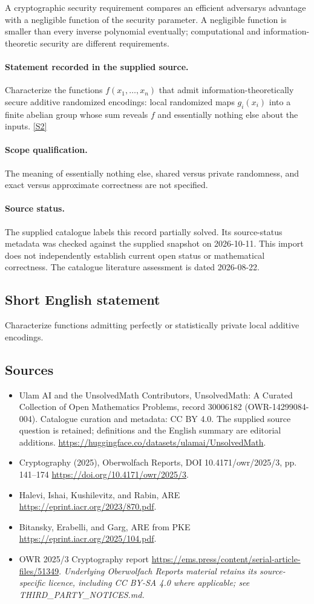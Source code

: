 \documentclass[11pt]{article}
\begin{document}
A cryptographic security requirement compares an efficient adversary\textquotesingle s advantage with a negligible function of the security parameter. A negligible function is smaller than every inverse polynomial eventually; computational and information-theoretic security are different requirements.
\paragraph{Statement recorded in the supplied source.}
Characterize the functions $f(x_1,\ldots,x_n)$ that admit information-theoretically secure additive randomized encodings: local randomized maps $g_i(x_i)$ into a finite abelian group whose sum reveals $f$ and essentially nothing else about the inputs. \href{https://doi.org/10.4171/owr/2025/3}{[S2]}
\paragraph{Scope qualification.}
The meaning of essentially nothing else, shared versus private randomness, and exact versus approximate correctness are not specified.
\paragraph{Source status.}
The supplied catalogue labels this record partially solved. Its source-status metadata was checked against the supplied snapshot on 2026-10-11. This import does not independently establish current open status or mathematical correctness. The catalogue literature assessment is dated 2026-08-22.
\subsection{Short English statement}
Characterize functions admitting perfectly or statistically private local additive encodings.
\subsection{Sources}
\begin{itemize}
\item[S1] Ulam AI and the UnsolvedMath Contributors, UnsolvedMath: A Curated Collection of Open Mathematics Problems, record 30006182 (OWR-14299084-004). Catalogue curation and metadata: CC BY 4.0. The supplied source question is retained; definitions and the English summary are editorial additions.
\url{https://huggingface.co/datasets/ulamai/UnsolvedMath}.
\item[S2] Cryptography (2025), Oberwolfach Reports, DOI 10.4171/owr/2025/3, pp. 141--174
\url{https://doi.org/10.4171/owr/2025/3}.
\item[S3] Halevi, Ishai, Kushilevitz, and Rabin, ARE
\url{https://eprint.iacr.org/2023/870.pdf}.
\item[S4] Bitansky, Erabelli, and Garg, ARE from PKE
\url{https://eprint.iacr.org/2025/104.pdf}.
\item[S5] OWR 2025/3 Cryptography report
\url{https://ems.press/content/serial-article-files/51349}.
\textit{Underlying Oberwolfach Reports material retains its source-specific licence, including CC BY-SA 4.0 where applicable; see THIRD\_PARTY\_NOTICES.md.}
\end{itemize}
\end{document}
